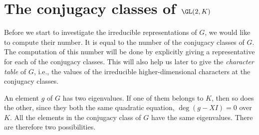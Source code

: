 \documentclass[../main.tex]{subfiles}
\begin{document}
\section{The conjugacy classes of \texorpdfstring{$\GL(2,K)$}{ GL(2,K)}} \label{sec:gl-2-k-classes}
Before we start to investigate the irreducible representations of $G$, we would like to compute their number. It is equal to the number of the conjugacy classes of $G$. The computation of this number will be done by explicitly giving a representative for each of the conjugacy classes. This will also help us later to give the \textit{character table} of $G$, i.e., the values of the irreducible higher-dimensional characters at the conjugacy classes.

An element $g$ of $G$ has two eigenvalues. If one of them belongs to $K$, then so does the other, since they both the same quadratic equation, $\deg(g-XI)=0$ over $K$. All the elements in the conjugacy class of $G$ have the same eigenvalues. There are therefore two possibilities.
\end{document}
